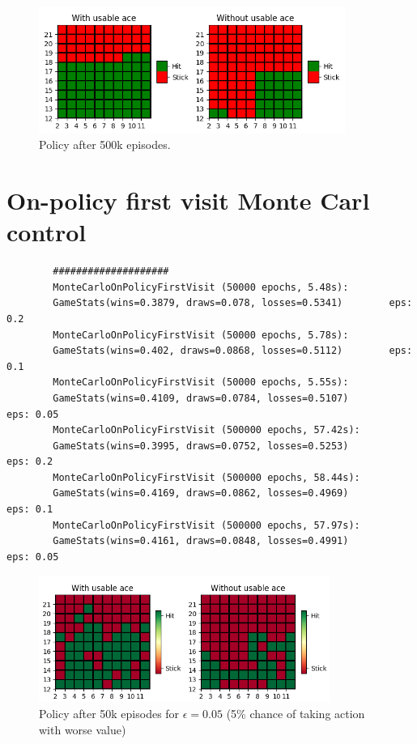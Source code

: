 \documentclass{article}
\begin{document}
    \newpage

    \begin{figure}[h]
        \centering
        \includegraphics[width=10cm]{plots/mces_policy_500k.png}
        \caption{Policy after 500k episodes.}
    \end{figure}


    \section{On-policy first visit Monte Carl control}

    \begin{verbatim}
        ####################
        MonteCarloOnPolicyFirstVisit (50000 epochs, 5.48s):
        GameStats(wins=0.3879, draws=0.078, losses=0.5341)        eps: 0.2
        MonteCarloOnPolicyFirstVisit (50000 epochs, 5.78s):
        GameStats(wins=0.402, draws=0.0868, losses=0.5112)        eps: 0.1
        MonteCarloOnPolicyFirstVisit (50000 epochs, 5.55s):
        GameStats(wins=0.4109, draws=0.0784, losses=0.5107)        eps: 0.05
        MonteCarloOnPolicyFirstVisit (500000 epochs, 57.42s):
        GameStats(wins=0.3995, draws=0.0752, losses=0.5253)        eps: 0.2
        MonteCarloOnPolicyFirstVisit (500000 epochs, 58.44s):
        GameStats(wins=0.4169, draws=0.0862, losses=0.4969)        eps: 0.1
        MonteCarloOnPolicyFirstVisit (500000 epochs, 57.97s):
        GameStats(wins=0.4161, draws=0.0848, losses=0.4991)        eps: 0.05
    \end{verbatim}

    \begin{figure}[h]
        \centering
        \includegraphics[width=9.5cm]{plots/mcopfv_policy_50k.png}
        \caption{Policy after 50k episodes for $\epsilon=0.05$ (5\% chance of taking action with worse value)}
    \end{figure}
\end{document}

